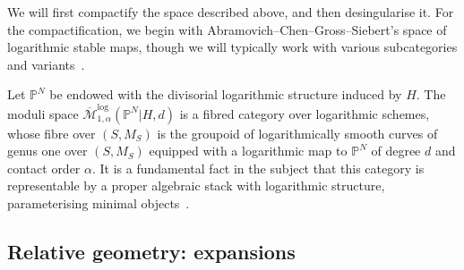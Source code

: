 \documentclass[11pt]{amsart}
\newcommand{\PP}{\mathbb P}
\newcommand{\VZ}{\pazocal{V\!Z}}
\renewcommand{\to}{\rightarrow}
\newcommand{\Mcal}{\mathcal{M}}
\newcommand{\ol}[1]{\overline{#1}}
\theoremstyle{definition}
\theoremstyle{definition}
\begin{document}
We will first compactify the space described above, and then desingularise it. For the compactification, we begin with Abramovich--Chen--Gross--Siebert's space of logarithmic stable maps, though we will typically work with various subcategories and variants~\cite{AbramovichChenLog,ChenLog,GrossSiebertLog,KimLog}.

Let $\PP^N$ be endowed with the divisorial logarithmic structure induced by $H$. The moduli space $\overline{\mathcal{M}}^{\operatorname{log}}_{1,\alpha}(\mathbb P^N|H,d)$ is a fibred category over logarithmic schemes, whose fibre over $(S,M_S)$ is the groupoid of logarithmically smooth curves of genus one over $(S,M_S)$ equipped with a logarithmic map to $\mathbb P^N$ of degree $d$ and contact order $\alpha$. It is a fundamental fact in the subject that this category is representable by a proper algebraic stack with logarithmic structure, parameterising minimal objects~\cite{ChenLog}. 

\subsection{Relative geometry: expansions} 
\end{document}
